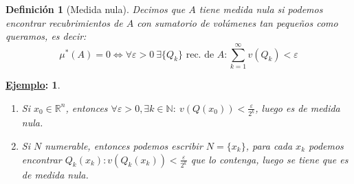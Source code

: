 \documentclass[10pt,a4paper,openright]{book}
\theoremstyle{break}
\newtheorem*{defi}{Definición}
\newtheorem*{ej}{\underline{Ejemplo}:}
\begin{document}
\begin{defi}[Medida nula]
Decimos que $A$ tiene medida nula si podemos encontrar recubrimientos de $A$ con sumatorio de volúmenes tan pequeños como queramos, es decir:
$$\mu^{*}\left( A \right) = 0 \Leftrightarrow \forall \varepsilon > 0 \ \exists \{Q_k\} \text{ rec. de } A: \sum_{k=1}^{\infty} v\left( Q_k \right) < \varepsilon $$  
\end{defi}

\begin{ej}
	\begin{enumerate}
       \item Si $x_0 \in \mathbb{R}^{n}$, entonces $\forall \varepsilon > 0, \exists k \in \mathbb N: \ v\left( Q\left( x_0 \right)  \right) < \frac{\varepsilon}{2^{k}}$, luego es de medida nula.
       \item Si $N$ numerable, entonces podemos escribir $N = \{x_k\}$, para cada $x_k$ podemos encontrar $Q_k\left( x_k \right): v\left( Q_k\left( x_k \right)  \right) < \frac{\varepsilon}{2^{k}}$ que lo contenga, luego se tiene que es de medida nula.
    \end{enumerate}
\end{ej}
    
\end{document}

